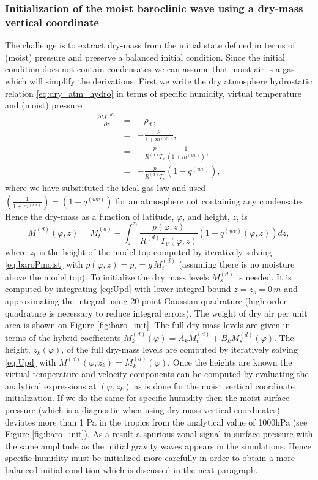 \documentclass{agujournal}
\begin{document}
{\subsubsection{Initialization of the moist baroclinic wave using a dry-mass vertical coordinate}
The challenge is to extract dry-mass from the initial state defined in terms of (moist) pressure and preserve a balanced initial condition. Since the initial condition does not contain condensates we can assume that moist air is a gas which will simplify the derivations. First we write the dry atmosphere hydrostatic relation \eqref{eq:dry_atm_hydro} in terms of specific humidity, virtual temperature and (moist) pressure
\begin{eqnarray}
\frac{\partial M^{(d)}}{\partial z}&=&-\rho_d\, ,\\
&=&-\frac{\rho}{1+m^{(wv)}},\\
&=&-\frac{p}{R^{(d)}T_v}\frac{1}{\left( 1+m^{(wv)}\right)},\\
&=&-\frac{p}{R^{(d)}T_v}\left(1-q^{(wv)}\right),
\end{eqnarray}
where we have substituted the ideal gas law and used $\left( \frac{1}{1+m^{(wv)}} \right)=\left( 1-q^{(wv)} \right)$ for an atmosphere not containing any condensates. Hence the dry-mass as a function of latitude, $\varphi$, and height, $z$, is
\begin{equation}
{M}^{(d)}(\varphi,z)=M^{(d)}_t-\int_z^{z_t}\frac{p(\varphi,z)}{R^{(d)} T_v(\varphi,z)}\left(1-q^{(wv)}(\varphi,z)\right) dz,\label{eq:Upd}
\end{equation}
where $z_t$ is the height of the model top computed by iteratively solving \eqref{eq:baroPmoist} with $p(\varphi,z)=p_t=g\, M^{(d)}_t$ (assuming there is no moisture above the model top). To initialize the dry mass levels $M^{(d)}_s$ is needed. It is computed by integrating \eqref{eq:Upd} with lower integral bound $z=z_s=0\, m$ and approximating the integral using 20 point Gaussian quadrature (high-order quadrature is necessary to reduce integral errors). The weight of dry air per unit area is shown on Figure \ref{fig:baro_init}. The full dry-mass levels are given in terms of the hybrid coefficients ${M_k^{(d)}}(\varphi)=A_k M^{(d)}_t+B_k {M_s^{(d)}}(\varphi)$. The height, $z_{k}(\varphi)$, of the full dry-mass levels are computed by iteratively solving \eqref{eq:Upd} with ${M}^{(d)}(\varphi,z_k)={M}_{k}^{(d)}(\varphi)$. Once the heights are known the virtual temperature and velocity components can be computed by evaluating the analytical expressions at $(\varphi,z_k)$ as is done for the moist vertical coordinate initialization. If we do the same for specific humidity then the moist surface pressure (which is a diagnostic when using dry-mass vertical coordinates) deviates more than 1 Pa in the tropics from the analytical value of 1000hPa  (see Figure \ref{fig:baro_init}). As a result a spurious zonal signal in surface pressure with the same amplitude as the initial gravity waves appears in the simulations. Hence specific humidity must be initialized more carefully in order to obtain a more balanced initial condition which is discussed in the next paragraph. 

}
\end{document}
